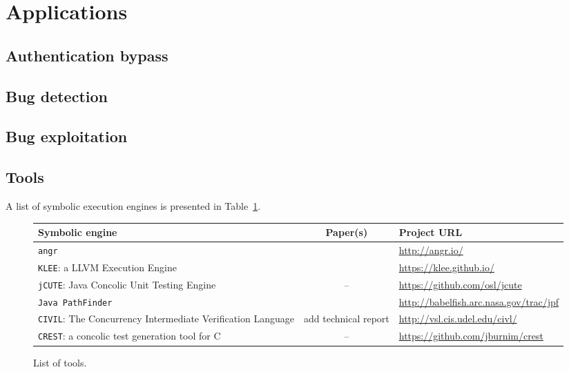 
\section{Applications}

\subsection{Authentication bypass}
\cite{FIRMALICE-NDSS15}

\subsection{Bug detection}
\cite{DRILLER-NDSS16}

\subsection{Bug exploitation}
\cite{MAYHEM-SP12}

\subsection{Tools}
A list of symbolic execution engines is presented in Table~\ref{tab:symbolic-engines}.

\begin{figure}[t]
  \centering
  \begin{adjustbox}{width=1\columnwidth}
  \begin{small}
  \begin{tabular}{| l || c || l |}
    \hline      
    Symbolic engine & Paper(s) & Project URL  \\ \hline\hline
    {\tt angr} & \cite{FIRMALICE-NDSS15} & \url{http://angr.io/} \\
    {\tt KLEE}: a LLVM Execution Engine & \cite{KLEE-OSDI08} & \url{https://klee.github.io/} \\
    {\tt jCUTE}: Java Concolic Unit Testing Engine & -- & \url{https://github.com/osl/jcute} \\
    {\tt Java PathFinder} & \cite{PATHFINDER-ASE10} & \url{http://babelfish.arc.nasa.gov/trac/jpf}\\
    {\tt CIVIL}: The Concurrency Intermediate Verification Language & add technical report & \url{http://vsl.cis.udel.edu/civl/}\\
    {\tt CREST}: a concolic test generation tool for C & -- & \url{https://github.com/jburnim/crest} \\
    \hline  
  \end{tabular}
  \end{small}
  \end{adjustbox}
  \caption{List of tools.}
  \label{tab:symbolic-engines}
\end{figure}